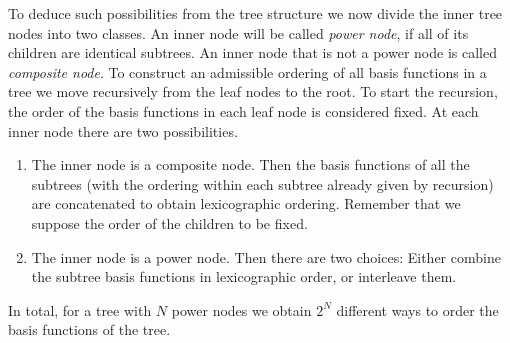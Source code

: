\documentclass[a4paper,10pt,headings=normal,bibliography=totoc]{scrartcl}
\begin{document}
To deduce such possibilities from the tree structure we now divide the inner tree nodes into two classes.
An inner node will be called {\em power node}, if all of its children are identical subtrees.
An inner node that is not a power node is called {\em composite node}.  To construct an admissible ordering
of all basis functions in a tree we move recursively from the leaf nodes to the root.  To start the recursion,
the order of the basis functions in each leaf node is considered fixed.  At each inner node there are two
possibilities.
\begin{enumerate}
 \item The inner node is a composite node.  Then the basis functions of all the subtrees (with the ordering
   within each subtree already given by recursion) are concatenated to obtain lexicographic ordering.
   Remember that we suppose the order of the children to be fixed.
 \item The inner node is a power node.  Then there are two choices: Either combine the subtree basis functions
   in lexicographic order, or interleave them.
\end{enumerate}
In total, for a tree with $N$ power nodes we obtain $2^N$ different ways to order the basis functions of the tree.
\end{document}
